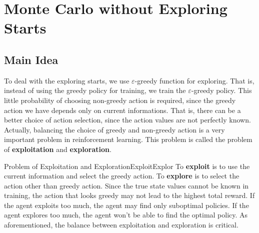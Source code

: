 \section{Monte Carlo without Exploring Starts}
    \subsection{Main Idea}
        To deal with the exploring starts, we use $\varepsilon$-greedy function for exploring.
        That is, instead of using the greedy policy for training, we train the $\varepsilon$-greedy policy.
        This little probability of choosing non-greedy action is required, since the greedy action we have depends
        only on current informations. That is, there can be a better choice of action selection, since the action values
        are not perfectly known. Actually, balancing the choice of greedy and non-greedy action is a very
        important problem in reinforcement learning. This problem is called the problem of \textbf{exploitation}
        and \textbf{exploration}.
        \begin{rem}{Problem of Exploitation and Exploration}{ExploitExplor}
            To \textbf{exploit} is to use the current information and select the greedy action.
            To \textbf{explore} is to select the action other than greedy action. Since the true state values cannot be known in
            training, the action that looks greedy may not lead to the highest total reward.
            If the agent exploits too much, the agent may find only suboptimal policies.
            If the agent explores too much, the agent won't be able to find the optimal policy.
            As aforementioned, the balance between exploitation and exploration is critical.
        \end{rem}

